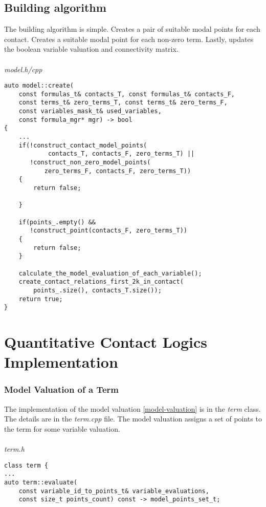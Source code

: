 \documentclass{article}
\begin{document}
	\subsection{Building algorithm}
	The building algorithm is simple. Creates a pair of suitable modal points for each contact. Creates a suitable modal point for each non-zero term. Lastly, updates the boolean variable valuation and connectivity matrix.
	\\
	\\
\noindent
\textit{model.h/cpp}
\begin{lstlisting}
auto model::create(
	const formulas_t& contacts_T, const formulas_t& contacts_F,
	const terms_t& zero_terms_T, const terms_t& zero_terms_F,
	const variables_mask_t& used_variables,
	const formula_mgr* mgr) -> bool
{
    ...
    if(!construct_contact_model_points(
            contacts_T, contacts_F, zero_terms_T) ||
       !construct_non_zero_model_points(
           zero_terms_F, contacts_F, zero_terms_T))
    {
        return false;

    }

    if(points_.empty() &&
       !construct_point(contacts_F, zero_terms_T))
    {
        return false;
    }

    calculate_the_model_evaluation_of_each_variable();
    create_contact_relations_first_2k_in_contact(
        points_.size(), contacts_T.size());
    return true;
}
\end{lstlisting}

	\newpage
	\section{Quantitative Contact Logics Implementation}
	\subsubsection*{Model Valuation of a Term}
	The implementation of the model valuation \ref{model-valuation} is in the \textit{term} class. The details are in the \textit{term.cpp} file.
	The model valuation assigns a set of points to the term for some variable valuation.
	\\
	\\
\noindent
\textit{term.h}
\begin{lstlisting}
class term {
...
auto term::evaluate(
	const variable_id_to_points_t& variable_evaluations,
	const size_t points_count) const -> model_points_set_t;
\end{lstlisting}	
\end{document}

